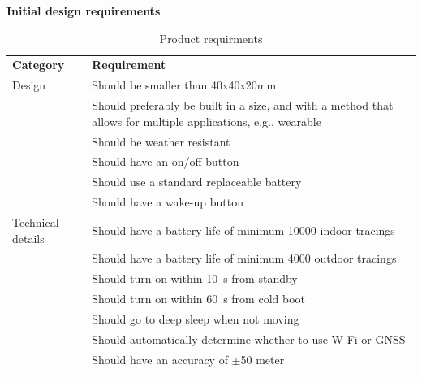 \textbf{Initial design requirements}
\begin{table}[H]
\centering
\caption{Product requirments}
\label{tab:product_requirements}
\begin{tabular}{lp{12cm}}
\textbf{Category} & \textbf{Requirement}                                                                                                \\
Design            & Should be smaller than 40x40x20mm                                                                                   \\
                  & Should preferably be built in a size, and with a method that allows for multiple applications, e.g., wearable \\
                  & Should be weather resistant                                                                                         \\
                  & Should have an on/off button                                                                                        \\
                  & Should use a standard replaceable battery                                                                          \\
                  & Should have a wake-up button                                                                                       \\
Technical details & Should have a battery life of minimum 10000 indoor tracings                                                        \\
                  & Should have a battery life of minimum 4000 outdoor tracings                                                        \\
                  & Should turn on within \SI{10}{\second} from standby                                                                      \\
                  & Should turn on within \SI{60}{\second} from cold boot                                                                    \\
                  & Should go to deep sleep when not moving                                                                             \\
                  & Should automatically determine whether to use W-Fi or \ac{GNSS}                                                          \\
                  & Should have an accuracy of $\pm$50 meter                                                                              
\end{tabular}%
\end{table}

